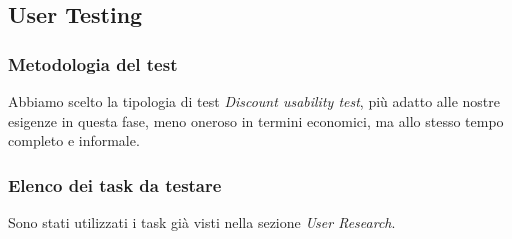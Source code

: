 \subsection{User Testing}
\subsubsection*{Metodologia del test}
Abbiamo scelto la tipologia di test \textit{Discount usability test}, più adatto alle nostre esigenze in questa fase, meno oneroso in termini economici, ma allo stesso tempo completo e informale.

\subsubsection*{Elenco dei task da testare}
Sono stati utilizzati i task già visti nella sezione \textit{User Research}.

